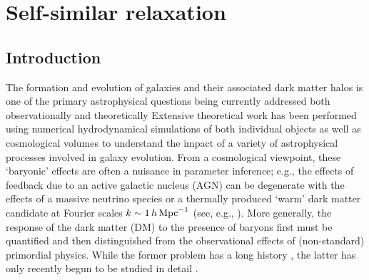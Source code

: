 \chapter{Self-similar relaxation}

\section{Introduction}
\label{sec:intro}


\noindent
The formation and evolution of galaxies and their associated dark matter halos is one of the primary astrophysical questions being currently addressed both observationally \cite{2020SDSS_Ahumadaetal_16th_data,2017Willetetal_GalxayZoo_HST,2023Harikane_etal_JWST}
and theoretically \cite{2015SomervilleDave,2018WechslerTinker}
Extensive theoretical work has been performed using numerical hydrodynamical simulations of both individual objects \cite{2006Dekel&Birnboim,2014Hopkins_FIRE,2015LauNagaietal,2023FIRE-2_publicrelease} as well as cosmological volumes \cite{2010Schaye_OWLS,2014Genel_Illustris,2015Schaye_EAGLE,2017Kaviraj_HorizonAGN,2018TNG_Pillepich_etal,2019Dave_SIMBA,2021camels_presentation} 
to understand the impact of a variety of astrophysical processes involved in galaxy evolution. From a cosmological viewpoint, these `baryonic' effects are often a nuisance in parameter inference; e.g., the effects of feedback due to an active galactic nucleus (AGN) can be degenerate with the effects of a massive neutrino species or a thermally produced `warm' dark matter candidate at Fourier scales $k\sim1\,h\,{\rm Mpc}^{-1}$ (see, e.g., \cite{2019Chisari_etal_Baryfeedback,2020AricoAnguloetal_baryonifi}).
More generally, the response of the dark matter (DM) to the presence of baryons first must be quantified and then distinguished from the observational effects of (non-standard) primordial physics. While the former problem has a long history \cite{1986Blumenthal,2004Gnesin_etal,2005SellwoodMcGaugh,2006Gustafsson_FS,2010Abadi_NFBS,2010DuffySchaye_etal,2010PedrosaTissera_etal,2010TisseraWhite_etal,2019ArtalePedrosa_etal,2022ForouharMoreno_etal,2023Velmani&Paranjape},
the latter has only recently begun to be studied in detail \cite{2011TeyssierMMDM,2015SchneiderTeyssier,2015Mead_PHJH,2020AricoAnguloetal_baryonifi,2021AricoAnguloetal_baryonifi,2023EuclidCastro_etal}.

